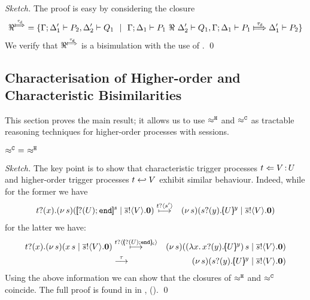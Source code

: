 \begin{proof}[Sketch]
	The proof is easy by considering the closure
	\[
		\Re^{\Hby{\dtau}} = \set{ \horel{\Gamma}{\Delta_1'}{P_2}{,}{\Delta_2'}{Q_1} \setbar \horel{\Gamma}{\Delta_1}{P_1}{\ \Re\ }{\Delta_2'}{Q_1},
		\horel{\Gamma}{\Delta_1}{P_1}{\Hby{\dtau}}{\Delta_1'}{P_2} }
	\]
	We verify that $\Re^{\Hby{\dtau}}$ is a bisimulation with
	the use of .
	\qed
\end{proof}



\subsection{Characterisation of Higher-order and Characteristic Bisimilarities}
\label{ss:charact}

This section proves the main result; %
it allows us to use $\approx^\mathtt{H}$ and $\approx^\mathtt{C}$ as tractable reasoning
techniques for higher-order processes with sessions.


\begin{lemma}
	\label{lem:wb_eq_wbf}
	$\approx^\mathtt{C}\ =\ \approx^\mathtt{H}$
\end{lemma}

\begin{proof}[Sketch]
	The key point is to show that
	characteristic trigger processes
	$t \Leftarrow V{\,:\,}U$
	and
	higher-order trigger processes
	$t \hookleftarrow V$
	exhibit similar behaviour.
Indeed, while for the former we have
	\begin{eqnarray*}
		\fotrigger{t}{x}{s}{\btinp{U} \tinact}{V} &\hby{\bactinp{t}{s'}}& \newsp{s}{ \binp{s}{y} \mapchar{U}{y}  \Par \bout{\dual{s}}{V} \inact}
			\end{eqnarray*}
		for the latter we have:
	\begin{eqnarray*}
		\hotrigger{t}{x}{s}{V} &\hby{\bactinp{t}{\omapchar{\btinp{U} \tinact}}}& \newsp{s}{ \appl{(\abs{x}{\binp{x}{y} \mapchar{U}{y}})}{s}  \Par \bout{\dual{s}}{V} \inact}\\
		&\by{\tau}& \newsp{s}{ \binp{s}{y} \mapchar{U}{y}  \Par \bout{\dual{s}}{V} \inact}
	\end{eqnarray*}
%
	Using the above information we can show that the closures of
	$\approx^\mathtt{H}$ and $\approx^\mathtt{C}$ coincide.
	The full proof is found in 
	in ,  ().
	\qed
\end{proof}

